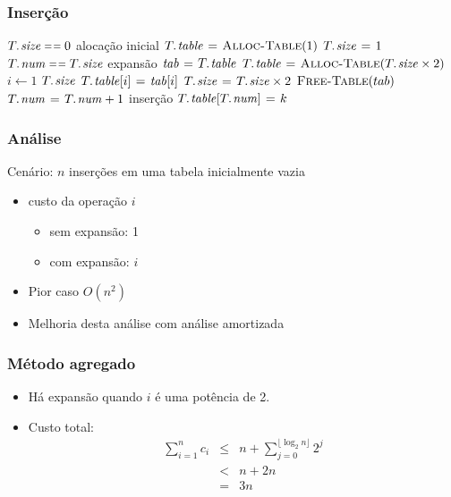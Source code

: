 \documentclass{beamer}
\begin{document}
\begin{frame}
\frametitle{Inserção}

\begin{codebox}
\li \If $\attrib{T}{size} \isequal 0$ \Comment alocação inicial
\li \Then $\attrib{T}{table} \gets \proc{Alloc-Table}(1)$
\li       $\attrib{T}{size} \gets 1$
\li \ElseIf $\attrib{T}{num} \isequal \attrib{T}{size}$ \Comment expansão
\li \Then $\id{tab} \gets \attrib{T}{table}$
\li   $\attrib{T}{table} \gets \proc{Alloc-Table}(\attrib{T}{size} \times 2)$
\li   \For $i \gets 1$ \To $\attrib{T}{size}$
\li   \Do $\attrib{T}{table}[i] \gets \id{tab}[i]$
      \End
\li   $\attrib{T}{size} \gets \attrib{T}{size} \times 2$
\li   $\textnormal{\scshape Free-Table}(tab)$
    \End
\li $\attrib{T}{num} \gets \attrib{T}{num}+1$ \Comment inserção
\li $\attrib{T}{table}[\attrib{T}{num}] \gets k$
\end{codebox}

\end{frame}

\begin{frame}
\frametitle{Análise}

Cenário: $n$ inserções em uma tabela inicialmente vazia
\begin{itemize}
\item custo da operação $i$
\begin{itemize}
\item sem expansão: 1
\item com expansão: $i$
\end{itemize}
\item Pior caso $O(n^2)$
\item Melhoria desta análise com análise amortizada
\end{itemize}

\end{frame}

\begin{frame}
\frametitle{Método agregado}
\begin{itemize}
\item Há expansão quando $i$ é uma potência de 2.
\item Custo total:
\begin{eqnarray*}
\sum_{i=1}^{n} c_i & \le & n + \sum_{j=0}^{\lfloor \log_2 n \rfloor} 2^j \\
& < & n + 2n \\
& = & 3n
\end{eqnarray*}
\end{itemize}

\end{frame}
\end{document}
